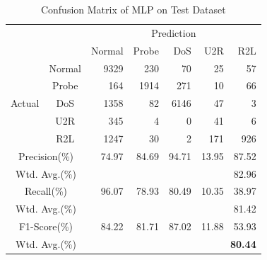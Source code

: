 \iffalse
\begin{table}[t]
    \caption{Confusion Matrix of MLP on Test Dataset}
    \centering
    \begin{tabular}{cc|rrrrr}
        \hline
        &  & \multicolumn{5}{c}{Prediction} \\
                        &        & Normal & Probe & DoS & U2R & R2L\\
        \hline
        \hline
        \multirow{5}{*}{Actual} & Normal & {\color{red}9329} &  230 &   70 &  25 &  57 \\
                                &  Probe &  164 & 1914 &  271 &  10 &  66 \\
                                &  DoS   & 1358 &   82 & {\color{red}6146} &  47 &   3 \\
                                &  U2R   &  345 &    4 &    0 &  {\color{red}41} &   6 \\
                                &  R2L   & 1247 &   30 &    2 & 171 & {\color{red}926} \\
        \hline
        \multicolumn{2}{c|}{Precision(\%)}   & 74.97 & 84.69 & 94.71 & 13.95 & 87.52\\
        \multicolumn{2}{c|}{Wtd. Avg.(\%)}   & \multicolumn{5}{r}{82.96}\\
        \hline
        \multicolumn{2}{c|}{Recall(\%)}      & 96.07 & 78.93 & 80.49 & 10.35 & 38.97\\
        \multicolumn{2}{c|}{Wtd. Avg.(\%)}   & \multicolumn{5}{r}{81.42}\\
        \hline
        \multicolumn{2}{c|}{F1-Score(\%)}    & 84.22 & 81.71 & 87.02 & 11.88 & 53.93\\
        \multicolumn{2}{c|}{Wtd. Avg.(\%)}   & \multicolumn{5}{r}{\textbf{\color{red}80.44}}\\
        \hline
    \end{tabular}
    \label{Tab:ConfusionMatrixMLP}
\end{table}


